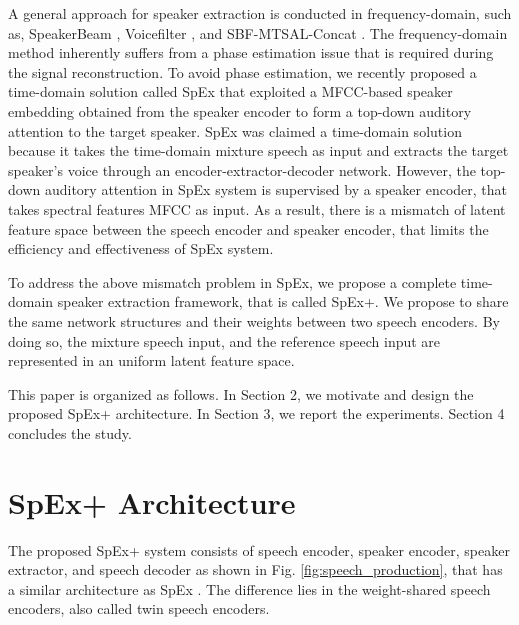 \documentclass[a4paper]{article}
\begin{document}
A general approach for speaker extraction is conducted in frequency-domain, such as, SpeakerBeam \cite{vzmolikova2017learning,delcroix2018single,delcroix2019compact,vzmolikova2019speakerbeam}, Voicefilter \cite{wang2018voicefilter}, and SBF-MTSAL-Concat \cite{xu2019optimization}. The frequency-domain  method inherently suffers from a phase estimation issue that is required during the signal reconstruction. To avoid phase estimation, we recently proposed a time-domain solution called SpEx \cite{spex2020} that exploited a MFCC-based speaker embedding obtained from the speaker encoder to form a top-down auditory attention to the target speaker. SpEx was claimed a time-domain solution because it takes the time-domain mixture speech as input and extracts the target speaker's voice through an encoder-extractor-decoder network. However, the top-down auditory attention in SpEx system is supervised by a speaker encoder, that takes spectral features MFCC as input. As a result, there is a mismatch of latent feature space between the speech encoder and speaker encoder, that limits the efficiency and effectiveness of SpEx system. 

To address the above mismatch problem in SpEx, we propose a complete time-domain speaker extraction framework, that is called SpEx+. We propose to share the same network structures and their weights between two speech encoders. By doing so, the mixture speech input, and the reference speech input are represented in an uniform latent feature space. 

This paper is organized as follows. In Section 2, we motivate and design the proposed SpEx+ architecture. In Section 3, we report the experiments. Section 4 concludes the study. 















\section{SpEx+ Architecture}
The proposed SpEx+ system consists of speech encoder, speaker encoder, speaker extractor, and speech decoder as shown in Fig. \ref{fig:speech_production}, that has a similar architecture as SpEx \cite{spex2020}. The difference lies in the weight-shared speech encoders, also called twin speech encoders.
\end{document}

